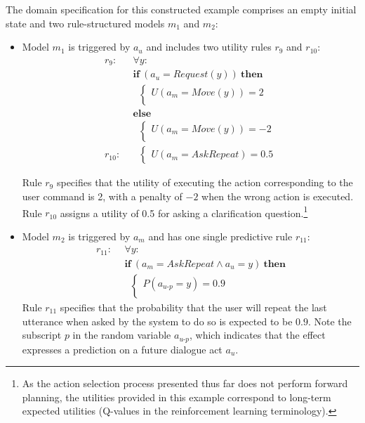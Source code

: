The domain specification for this constructed example comprises an empty initial state and two rule-structured models $m_1$ and $m_2$: \begin{itemize}
\item Model $m_1$ is triggered by $a_u$ and includes two utility rules $r_{9}$ and $r_{10}$:
\begin{align*}
r_{9}: \ \ & \forall y: \\ 
& \textbf{if} \ (a_u = Request(y)) \ \textbf{then} \\ 
& \; \; \begin{cases} 
U(a_m = Move(y)) = 2 \\ 
\end{cases} \\
& \textbf{else} \\ 
& \; \; \begin{cases} 
U(a_m = Move(y)) = -2 \\ 
\end{cases} \\[4mm]
r_{10}: \ \ &  \; \; \begin{cases} U(a_m = \mathit{AskRepeat}) = 0.5 \end{cases}
\end{align*}

Rule $r_{9}$ specifies that the utility of executing the action corresponding to the user command is 2, with a penalty of $-2$ when the wrong action is executed. Rule $r_{10}$ assigns a utility of 0.5 for asking a clarification question.\footnote{As the action selection process presented thus far does not perform forward planning, the utilities provided in this example correspond to long-term expected utilities (Q-values in the reinforcement learning terminology).}

\item Model $m_2$ is triggered by $a_m$ and has one single predictive rule $r_{11}$: 
\begin{align*}
r_{11}: \ \ & \forall y: \\ 
& \textbf{if} \ (a_m = \mathit{AskRepeat} \land a_u=y) \ \textbf{then} \\ 
& \; \;  \begin{cases} 
P(a_{u\mbox{-}p} = y) = 0.9 \\ 
\end{cases}
\end{align*}
Rule $r_{11}$ specifies that the probability that the user will repeat the last utterance when asked by the system to do so is expected to be $0.9$. Note the subscript $p$ in the random variable $a_{u\mbox{-}p}$, which indicates that the effect expresses a prediction on a future dialogue act $a_u$.  
\end{itemize}

